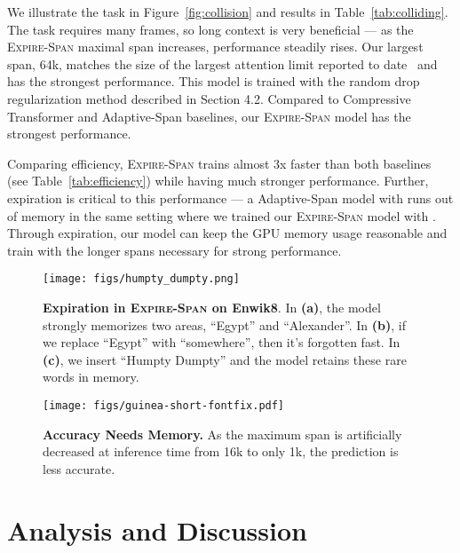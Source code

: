 We illustrate the task in Figure~\ref{fig:collision} and results in Table~\ref{tab:colliding}. The task requires many frames, so long context is very beneficial --- as the \textsc{Expire-Span} maximal span increases, performance steadily rises. Our largest span, 64k, matches the size of the largest attention limit reported to date~\citep{kitaev2019reformer} and has the strongest performance. This model is trained with the random drop regularization method described in Section 4.2. Compared to Compressive Transformer and Adaptive-Span baselines, our \textsc{Expire-Span} model has the strongest performance. 

Comparing efficiency, \textsc{Expire-Span} trains almost 3x faster than both baselines (see Table~\ref{tab:efficiency}) while having much stronger performance. Further, expiration is critical to this performance --- a Adaptive-Span model with  runs out of memory in the same setting where we trained our \textsc{Expire-Span} model with . Through expiration, our model can keep the GPU memory usage reasonable and train with the longer spans necessary for strong performance.

\begin{figure*}[t]
\begin{minipage}{0.63\textwidth}
    \centering 
    \texttt{[image: figs/humpty\_dumpty.png]}
    \caption{\textbf{Expiration in \textsc{Expire-Span} on Enwik8}. In \textbf{(a)}, the model strongly memorizes two areas,  ``Egypt'' and ``Alexander''. In \textbf{(b)}, if we replace ``Egypt'' with ``somewhere'', then it's forgotten fast. In \textbf{(c)}, we insert ``Humpty Dumpty'' and the model retains these rare words in memory.}
    \label{fig:vis_enwiki8}
\end{minipage}
\hfill
\begin{minipage}{0.33\textwidth}
\setlength{\tabcolsep}{3.2pt}
\texttt{[image: figs/guinea-short-fontfix.pdf]}
    \caption{\textbf{Accuracy Needs Memory.} As the maximum span is artificially decreased at inference time from 16k to only 1k, the prediction is less accurate.}
    \label{fig:enwik8_loss}
\end{minipage}
\end{figure*}



\section{Analysis and Discussion} 


